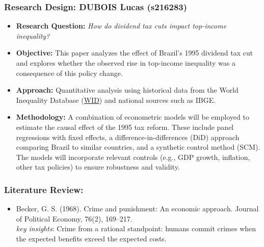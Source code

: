\documentclass{beamer}
\begin{document}
\begin{frame}
    \frametitle{\Large{Research Design:} DUBOIS Lucas (s216283)}
    \begin{itemize}
        \item \textbf{Research Question:} \textit{How do dividend tax cuts impact top-income inequality?}
        \item \textbf{Objective:} This paper analyzes the effect of Brazil’s 1995 dividend tax cut and explores whether the observed rise in top-income inequality was a consequence of this policy change.
        \item \textbf{Approach:} Quantitative analysis using historical data from the World Inequality Database (\href{https://wid.world/country/brazil/}{WID}) and national sources such as IBGE.
        \item \textbf{Methodology:} A combination of econometric models will be employed to estimate the causal effect of the 1995 tax reform. These include panel regressions with fixed effects, a difference-in-differences (DiD) approach comparing Brazil to similar countries, and a synthetic control method (SCM). The models will incorporate relevant controls (e.g., GDP growth, inflation, other tax policies) to ensure robustness and validity.
    \end{itemize}
\end{frame}

\begin{frame}
    \frametitle{\LARGE Literature Review:}
    \begin{itemize}
        \item Becker, G. S. (1968). Crime and punishment: An economic approach. Journal of Political Economy, 76(2), 169–217.
        \\\vspace{0.1cm}
        \hspace{0.5cm}\textit{key insights}: Crime from a rational standpoint: humans commit crimes when the expected benefits exceed the expected costs.
    \end{itemize}
\end{frame}
\end{document}
